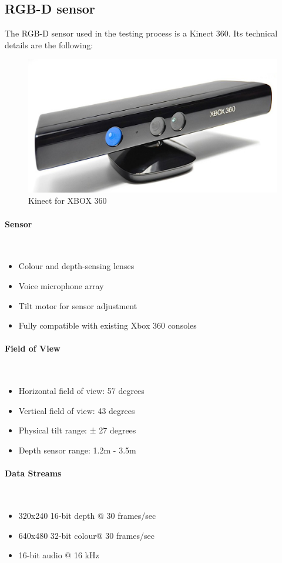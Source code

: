 \subsection{RGB-D sensor}
	The RGB-D sensor used in the testing process is a Kinect 360. Its technical details are the following: 
	\begin{figure}[H]
		\begin{center}
	\includegraphics[scale=0.3]{img/kinect.eps}
		\caption[Kinect image]{Kinect for XBOX 360}
		\end{center}
	\end{figure}
	\paragraph{ Sensor} \mbox{} \\
		\begin{itemize}
			\item Colour and depth-sensing lenses
			\item Voice microphone array
			\item Tilt motor for sensor adjustment
			\item Fully compatible with existing Xbox 360 consoles
		\end{itemize}
		\vspace*{0.5cm}

	\paragraph{ Field of View} \mbox{} \\
		\begin{itemize}

			\item Horizontal field of view: 57 degrees
			\item Vertical field of view: 43 degrees
			\item Physical tilt range: ± 27 degrees
			\item Depth sensor range: 1.2m - 3.5m
		\end{itemize}
		\vspace*{0.5cm}

	\paragraph{ Data Streams} \mbox{} \\
		\begin{itemize}

			\item 320x240 16-bit depth @ 30 frames/sec
			\item 640x480 32-bit colour@ 30 frames/sec
			\item 16-bit audio @ 16 kHz
		\end{itemize}
		\vspace*{0.5cm}
